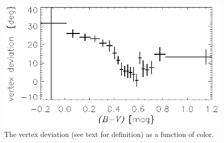 \documentclass[12pt,preprint]{aastex}
\begin{document}
\clearpage
\begin{figure}
\includegraphics{lsr_1_vertex.ps}
\caption{The vertex deviation (see text for definition) as a function
of color.\label{fig:lsr_1_vertex}}
\end{figure}
\end{document}
